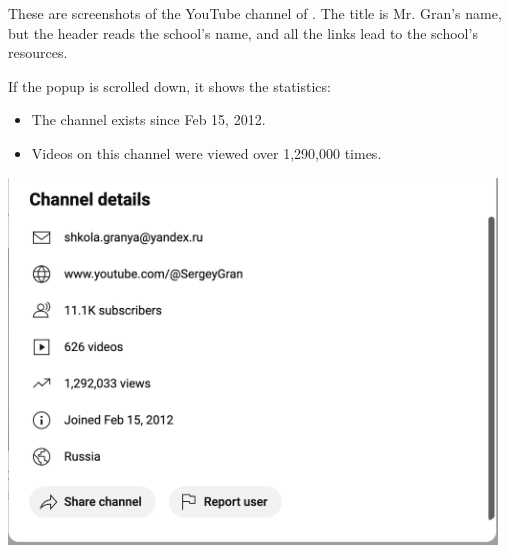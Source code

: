 
These are screenshots of the YouTube channel of \GSchool.
The title is Mr. Gran's name, but the header reads the school's name,
and all the links lead to the school's resources.

If the popup is scrolled down,
it shows the statistics:

\begin{itemize}
    \item The channel exists since Feb 15, 2012.
    \item Videos on this channel were viewed over 1,290,000 times.
\end{itemize}



\begin{center}
    \includegraphics[width=35em]{gran-youtube-stat}
\end{center}

\pagebreak
